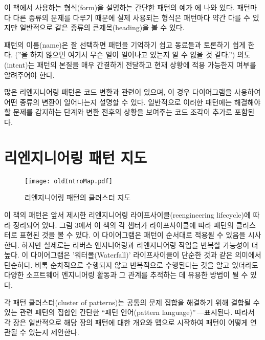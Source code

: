 \documentclass[a4paper,10pt,twoside]{book}
\begin{document}
이 책에서 사용하는 형식(form)을 설명하는 간단한 패턴의 예가 에 나와 있다. 패턴마다 다른 종류의 문제를 다루기 때문에 실제 사용되는 형식은 패턴마다 약간 다를 수 있지만 일반적으로 같은 종류의 큰제목(heading)을 볼 수 있다.

패턴의 이름(name)은 잘 선택하면 패턴을 기억하기 쉽고 동료들과 토론하기 쉽게 한다. (''을 하지 않으면 여기서 무슨 일이 일어나고 있는지 알 수 없을 것 같다.'') 의도(intent)는 패턴의 본질을 매우 간결하게 전달하고 현재 상황에 적용 가능한지 여부를 알려주어야 한다. 

많은 리엔지니어링 패턴은 코드 변환과 관련이 있으며, 이 경우 다이어그램을 사용하여 어떤 종류의 변환이 일어나는지 설명할 수 있다. 일반적으로 이러한 패턴에는 해결해야 할 문제를 감지하는 단계와 변환 전후의 상황을 보여주는 코드 조각이 추가로 포함된다.

\section{리엔지니어링 패턴 지도}

\begin{figure}
\begin{center}
\texttt{[image: oldIntroMap.pdf]}
\caption{리엔지니어링 패턴의 클러스터 지도}
\end{center}
\end{figure}

이 책의 패턴은 앞서 제시한 리엔지니어링 라이프사이클(reengineering lifecycle)에 따라 정리되어 있다. 그림 3에서 이 책의 각 챕터가 라이프사이클에 따라 패턴의 클러스터로 표현된 것을 볼 수 있다. 이 다이어그램은 패턴이 순서대로 적용될 수 있음을 시사한다. 하지만 실제로는 리버스 엔지니어링과 리엔지니어링 작업을 반복할 가능성이 더 높다. 이 다이어그램은 '워터폴(Waterfall)' 라이프사이클이 단순한 것과 같은 의미에서 단순하다. 비록 순차적으로 수행되지 않고 반복적으로 수행된다는 것을 알고 있더라도 다양한 소프트웨어 엔지니어링 활동과 그 관계를 추적하는 데 유용한 방법이 될 수 있다.

각 패턴 클러스터(cluster of patterns)는 공통의 문제 집합을 해결하기 위해 결합될 수 있는 관련 패턴의 집합인 간단한 ``패턴 언어(pattern language)''\,---\로 표시된다. 따라서 각 장은 일반적으로 해당 장의 패턴에 대한 개요와 맵으로 시작하여 패턴이 어떻게 연관될 수 있는지 제안한다.

\end{document}
